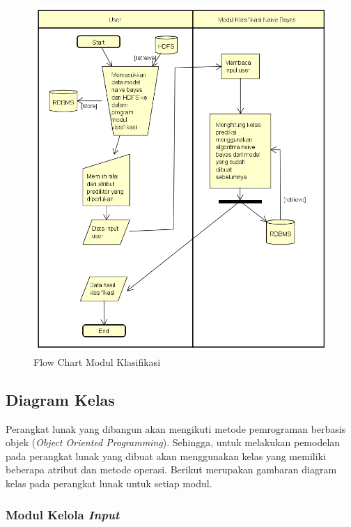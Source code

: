 \begin{figure}[H]
	\centering
	\includegraphics[scale=0.65]{Diagram/Flowchart_Klasifikasi}
	\caption[Flow Chart Modul Klasifikasi]{Flow Chart Modul Klasifikasi}
	\label{fig:Flow Chart Modul Klasifikasi}
\end{figure}

\subsection{Diagram Kelas}

Perangkat lunak yang dibangun akan mengikuti metode pemrograman berbasis objek (\textit{Object Oriented Programming}). Sehingga, untuk melakukan pemodelan pada perangkat lunak yang dibuat akan menggunakan kelas yang memiliki beberapa atribut dan metode operasi. Berikut merupakan gambaran diagram kelas pada perangkat lunak untuk setiap modul.

\subsubsection{Modul Kelola \textit{Input}}

